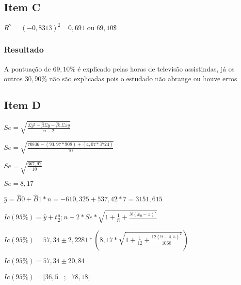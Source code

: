 \documentclass{article}
\begin{document}
    \subsection{Item C}

            \begin{flushleft}
                $R^2 = (-0,8313)^2$ =$0,691$ ou $69,10\$$
            \end{flushleft}

            \subsubsection{Resultado}
            \paragraph{}A pontuação de $69,10\% $ é explicado pelas horas de televisão assistindas, 
                        já os outros $30,90\%$ não são explicadas
                        pois o estudado não abrange ou houve erros 

    \subsection{Item D}
            \begin{flushleft}
            $Se = \sqrt{ \frac{\Sigma y^2 - \hat{\beta } \Sigma y - \hat{\beta}1 \Sigma xy }{n-2}}$
            \end{flushleft}   

            \begin{flushleft}
            $Se = \sqrt{ \frac{70836 - (93,97 * 908)+ (4,07 * 3724) }{10}}$

            $Se = \sqrt{ \frac{667,92}{10}}$

            $Se = 8,17$
            \end{flushleft}   

            \begin{flushleft}
            $\hat{y} = \hat{B}0 + \hat{B}1 *n = -610,325 + 537,42 * 7=3151,615$
            \end{flushleft}   

            \begin{flushleft}
            $Ic(95\%) = \hat{y} + t\frac{a}{2};n-2 *Se* \sqrt{1 + \frac{1}{n} +\frac{N(x_0 -x)^2}{}}$

            $Ic(95\%) = 57,34 \pm 2,2281 *  (8,17* \sqrt{1 + \frac{1}{12} + \frac{12(9-4,5)^2}{1068}})$

            $Ic(95\%) =  57,34 \pm 20,84$

            $Ic(95\%) = [36,5$ \ ; \ $78,18]$
            \end{flushleft}
\end{document}
